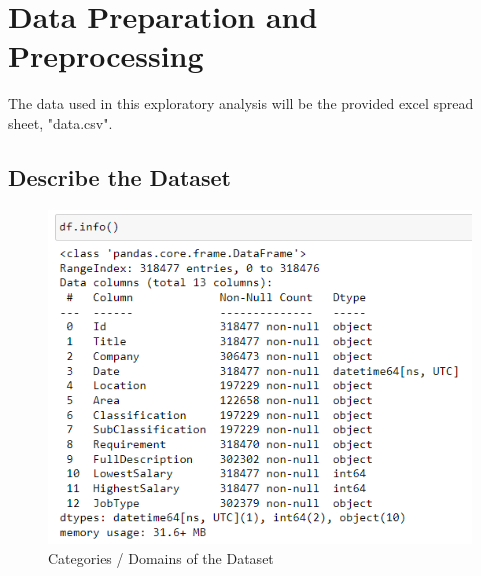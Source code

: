 \documentclass[twoside, 12pt, a4paper]{article}
\begin{document}

\pagestyle{fancy}
\fancyfoot[C]{\thepage}
\fancyfoot[L,R]{}
\setcounter{page}{1}



\tableofcontents



\newpage
{}
\setcounter{page}{1}
\pagestyle{fancy}

\fancyfoot[LE,RO]{\thepage}
\fancyfoot[C]{}

\section{Data Preparation and Preprocessing}
The data used in this exploratory analysis will be the provided excel spread sheet, "data.csv". 
\subsection{Describe the Dataset}

\begin{figure}[h]
	\centering
	\includegraphics[scale = 0.65]{cats.png}
	\caption{Categories / Domains of the Dataset}
	\label{fig:cats}
\end{figure}
\end{document}
